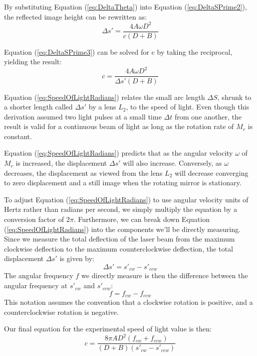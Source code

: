 \documentclass[twocolumn]{article}
\begin{document}
	By substituting Equation (\ref{eq:DeltaTheta}) into Equation (\ref{eq:DeltaSPrime2}), the reflected image height can be rewritten as:
	\begin{equation}
		\Delta s' = \frac{4A\omega D^2}{c(D+B)}
		\label{eq:DeltaSPrime3}
	\end{equation}
	
	Equation (\ref{eq:DeltaSPrime3}) can be solved for c by taking the reciprocal, yielding the result:
	\begin{equation}
		c = \frac{4A\omega D^2}{\Delta s'(D+B)}
		\label{eq:SpeedOfLightRadians}
	\end{equation}
	
	Equation (\ref{eq:SpeedOfLightRadians}) relates the small arc length $\Delta S$, shrunk to a shorter length called $\Delta s'$ by a lens $L_2$, to the speed of light. 
	Even though this derivation assumed two light pulses at a small time $\Delta t$ from one another, the result is valid for a continuous beam of light as long as the rotation rate of $M_r$ is constant. 
	
	Equation (\ref{eq:SpeedOfLightRadians}) predicts that as the angular velocity $\omega$ of $M_r$ is increased, the displacement $\Delta s'$ will also increase. 
	Conversely, as $\omega$ decreases, the displacement as viewed from the lens $L_2$ will decrease converging to zero displacement and a still image when the rotating mirror is stationary. 
	
	To adjust Equation (\ref{eq:SpeedOfLightRadians}) to use angular velocity units of Hertz rather than radians per second, we simply multiply the equation by a conversion factor of $2\pi$.
	Furthermore, we can break down Equation (\ref{eq:SpeedOfLightRadians}) into the components we'll be directly measuring.
	Since we measure the total deflection of the laser beam from the maximum clockwise deflection to the maximum counterclockwise deflection, the total displacement $\Delta s'$ is given by:
	\begin{equation}
		\Delta s' = s'_{cw} - s'_{ccw}
	\end{equation} 
	The angular frequency $f$ we directly measure is then the difference between the angular frequency at $s'_{cw}$ and $s'_{ccw}$:
	\begin{equation}
		f = f_{cw} - f_{ccw}
	\end{equation}
	This notation assumes the convention that a clockwise rotation is positive, and a counterclockwise rotation is negative.
	
	Our final equation for the experimental speed of light value is then:
	\begin{equation} \label{eq:SpeedofLightCalc1}
	c = \frac{ 8\pi AD^2 (f_{cw} + f_{ccw})}
	{ (D + B) (s'_{cw} - s'_{ccw})}
	\end{equation}
	
\end{document}
